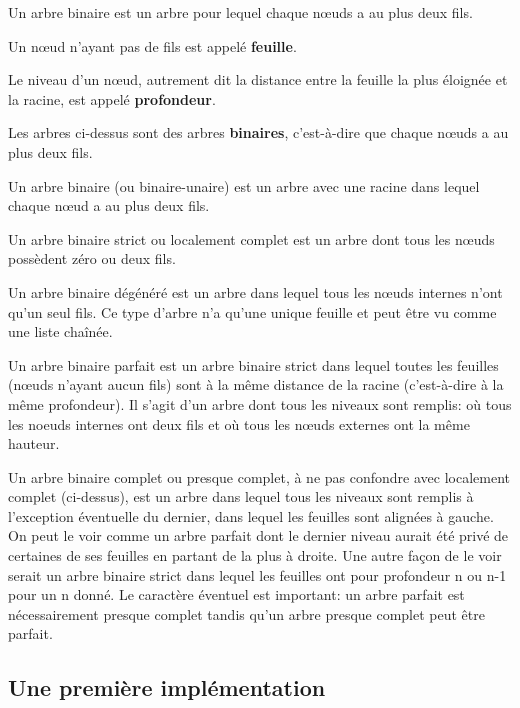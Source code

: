 \begin{defi}\cite{ref_03}

Un arbre binaire est un arbre pour lequel chaque n\oe{}uds a au plus deux fils.

Un n\oe{}ud n'ayant pas de fils est appelé \textbf{feuille}. 

Le niveau d'un nœud, autrement dit la distance entre la feuille la plus éloignée et la racine, est appelé \textbf{profondeur}.
\end{defi}


Les arbres ci-dessus sont des arbres \textbf{binaires}, c'est-à-dire que chaque n\oe{}uds a au plus deux fils. 


\begin{defi}
Un arbre binaire (ou binaire-unaire) est un arbre avec une racine dans lequel chaque nœud a au plus deux fils.

Un arbre binaire strict ou localement complet est un arbre dont tous les nœuds possèdent zéro ou deux fils.

Un arbre binaire dégénéré est un arbre dans lequel tous les n\oe{}uds internes n'ont qu'un seul fils. Ce type d'arbre n'a qu'une unique feuille et peut être vu comme une liste chaînée.

Un arbre binaire parfait est un arbre binaire strict dans lequel toutes les feuilles (nœuds n'ayant aucun fils) sont à la même distance de la racine (c'est-à-dire à la même profondeur). Il s'agit d'un arbre dont tous les niveaux sont remplis: où tous les noeuds internes ont deux fils et où tous les n\oe{}uds externes ont la même hauteur.

Un arbre binaire complet ou presque complet, à ne pas confondre avec localement complet (ci-dessus), est un arbre dans lequel tous les niveaux sont remplis à l'exception éventuelle du dernier, dans lequel les feuilles sont alignées à gauche. On peut le voir comme un arbre parfait dont le dernier niveau aurait été privé de certaines de ses feuilles en partant de la plus à droite. Une autre façon de le voir serait un arbre binaire strict dans lequel les feuilles ont pour profondeur n ou n-1 pour un n donné. Le caractère éventuel est important: un arbre parfait est nécessairement presque complet tandis qu'un arbre presque complet peut être parfait.
\end{defi}

\subsection{Une première implémentation}
